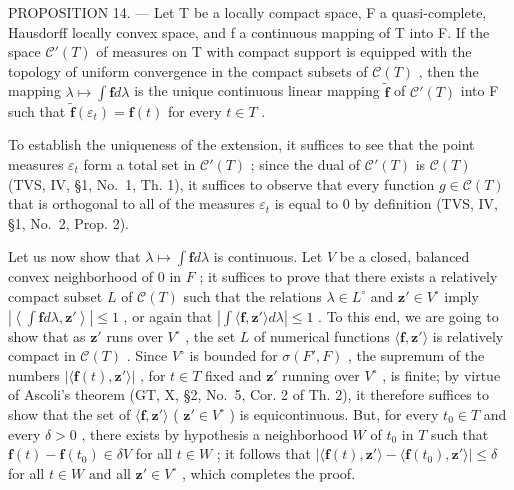PROPOSITION 14. --- Let T be a locally compact space, F a quasi-complete, Hausdorff locally convex space, and f a continuous mapping of T into F. If the space \(\mathcal{C}'(T)\) of measures on T with compact support is equipped with the topology of uniform convergence in the compact subsets of \(\mathcal{C}(T)\) , then the mapping \(\lambda \mapsto \int \mathbf{f} d\lambda\) is the unique continuous linear mapping \(\widetilde{\mathbf{f}}\) of \(\mathcal{C}'(T)\) into F such that \(\widetilde{\mathbf{f}}(\varepsilon_t) = \mathbf{f}(t)\) for every \(t \in T\) .

To establish the uniqueness of the extension, it suffices to see that the point measures \(\varepsilon_{t}\) form a total set in \(\mathcal{C}'(T)\) ; since the dual of \(\mathcal{C}'(T)\) is \(\mathcal{C}(T)\) (TVS, IV, §1, No.~1, Th. 1), it suffices to observe that every function \(g \in \mathcal{C}(T)\) that is orthogonal to all of the measures \(\varepsilon_{t}\) is equal to 0 by definition (TVS, IV, §1, No.~2, Prop. 2).

Let us now show that \(\lambda \mapsto \int \mathbf{f}d\lambda\) is continuous. Let \(V\) be a closed, balanced convex neighborhood of 0 in \(F\) ; it suffices to prove that there exists a relatively compact subset \(L\) of \(\mathcal{C}(T)\) such that the relations \(\lambda \in L^{\circ}\) and \(\mathbf{z}' \in V^{\circ}\) imply \(\left|\left\langle \int \mathbf{f}d\lambda, \mathbf{z}' \right\rangle \right| \leqslant 1\) , or again that \(\left|\int \langle \mathbf{f}, \mathbf{z}' \rangle d\lambda \right| \leqslant 1\) . To this end, we are going to show that as \(\mathbf{z}'\) runs over \(V^{\circ}\) , the set \(L\) of numerical functions \(\langle \mathbf{f}, \mathbf{z}' \rangle\) is relatively compact in \(\mathcal{C}(T)\) . Since \(V^{\circ}\) is bounded for \(\sigma(F', F)\) , the supremum of the numbers \(|\langle \mathbf{f}(t), \mathbf{z}' \rangle|\) , for \(t \in T\) fixed and \(\mathbf{z}'\) running over \(V^{\circ}\) , is finite; by virtue of Ascoli's theorem (GT, X, §2, No.~5, Cor. 2 of Th. 2), it therefore suffices to show that the set of \(\langle \mathbf{f}, \mathbf{z}' \rangle\) ( \(\mathbf{z}' \in V^{\circ}\) ) is equicontinuous. But, for every \(t_0 \in T\) and every \(\delta > 0\) , there exists by hypothesis a neighborhood \(W\) of \(t_0\) in \(T\) such that \(\mathbf{f}(t) - \mathbf{f}(t_0) \in \delta V\) for all \(t \in W\) ; it follows that \(|\langle \mathbf{f}(t), \mathbf{z}' \rangle - \langle \mathbf{f}(t_0), \mathbf{z}' \rangle| \leqslant \delta\) for all \(t \in W\) and all \(\mathbf{z}' \in V^{\circ}\) , which completes the proof.

